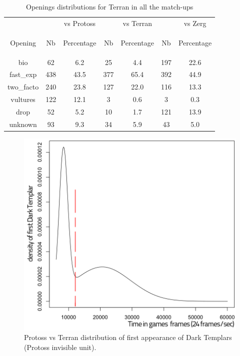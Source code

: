 \begin{table}[h]
\caption{Openings distributions for Terran in all the match-ups}
\vspace{-0.5cm}
\begin{center}
\begin{tabular}{|c|cc|cc|cc|}
\hline
&  & vs Protoss &  & vs Terran &  & vs Zerg \\
Opening
& Nb
& \begin{scriptsize}Percentage\end{scriptsize}
& Nb
& \begin{scriptsize}Percentage\end{scriptsize}
& Nb
& \begin{scriptsize}Percentage\end{scriptsize} \\ \hline
bio 	    & 62 	& 6.2 	& 25 	& 4.4   & 197 	& 22.6 \\
fast\_exp 	& 438 	& 43.5 	& 377 	& 65.4  & 392 	& 44.9 \\
two\_facto 	& 240 	& 23.8  & 127 	& 22.0  & 116 	& 13.3 \\
vultures 	& 122 	& 12.1  & 3 	& 0.6   & 3 	& 0.3  \\
drop 	    & 52 	& 5.2   & 10 	& 1.7   & 121 	& 13.9 \\
unknown 	& 93 	& 9.3   & 34 	& 5.9   & 43 	& 5.0 \\ \hline
\end{tabular}
\label{openings_distrib}
\end{center}
\end{table}

\begin{figure}[htp]
\centerline{\includegraphics[width=0.7\columnwidth]{images/PvTfastDT.png}}
\caption{Protoss vs Terran distribution of first appearance of Dark Templars (Protoss invisible unit).}
\label{PvTfastDT}
\end{figure}

